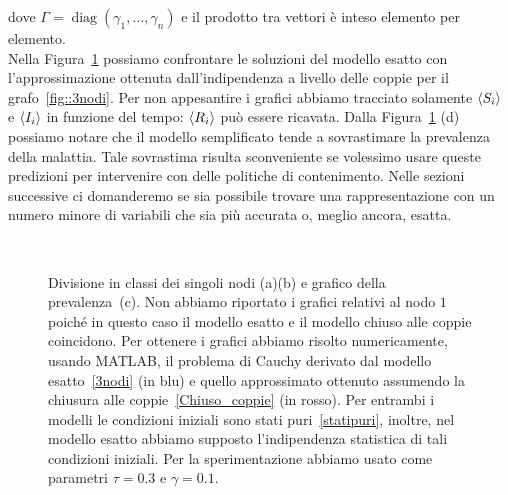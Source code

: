 dove $\Gamma=\operatorname{diag}(\gamma_1, \dots, \gamma_n)$ e il prodotto tra vettori \`e inteso elemento per elemento.\\

Nella Figura~\ref{fig::coppie3nodi} possiamo confrontare le soluzioni del modello esatto con l'approssimazione ottenuta  dall'indipendenza a livello delle coppie per il grafo~\ref{fig::3nodi}. Per non appesantire i grafici abbiamo tracciato solamente  $\langle S_i \rangle$ e $\langle I_i \rangle$ in funzione  del tempo: $\langle  R_i \rangle$ pu\`o essere ricavata.  
Dalla Figura~\ref{fig::coppie3nodi} (d) possiamo notare che il modello semplificato tende a sovrastimare la prevalenza della malattia. Tale sovrastima risulta sconveniente se volessimo usare queste  predizioni per intervenire con delle politiche di contenimento. Nelle sezioni successive ci domanderemo se sia possibile trovare una rappresentazione con un numero minore di variabili che sia pi\`u accurata o, meglio ancora, esatta. 
\begin{figure}[!b]
	\centering
\subfloat[][Nodo 2]{
	 
	} 

\subfloat[][Nodo 3]{
	
	}
\\
\end{figure}
\begin{figure}[t]
\ContinuedFloat
\centering
\subfloat[][Prevalenza.]
{}
\caption[Confronto tra modello esatto e chiuso alle coppie per~\ref{fig::3nodi}]{Divisione in classi dei  singoli nodi (a)(b) e grafico della prevalenza~(c). Non abbiamo riportato i grafici relativi al nodo $1$ poich\'e in questo caso il modello esatto e il modello chiuso alle coppie coincidono. Per ottenere i grafici abbiamo risolto numericamente,  usando MATLAB,  il problema di Cauchy derivato dal modello esatto~\eqref{3nodi} (in blu) e quello approssimato  ottenuto   assumendo la chiusura alle coppie~\eqref{Chiuso_coppie} (in rosso).  Per entrambi i modelli le condizioni iniziali sono stati puri~\eqref{statipuri}, inoltre,  nel modello esatto abbiamo supposto l'indipendenza statistica di tali condizioni iniziali. Per la sperimentazione abbiamo usato come parametri $\tau=0.3$ e $\gamma=0.1$.\\}
\label{fig::coppie3nodi}
\end{figure}

